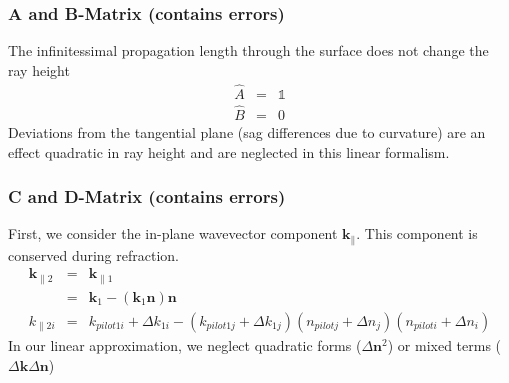 \documentclass[12pt,a4paper,twoside,openright,BCOR10mm,headsepline,titlepage,abstracton,chapterprefix,final]{scrreprt}
\newcommand\Vector[1]{{\mathbf{#1}}}
\newcommand\wavenumber{k}
\newcommand\Wavevector{\Vector{\wavenumber}}
\newcommand\unittensor{\mathds{1}}
\begin{document}
\subsubsection{A and B-Matrix (contains errors)}
The infinitessimal propagation length through the surface does not change the ray height
\begin{eqnarray}
 \hat{A} &=& \unittensor \\
 \hat{B} &=& 0
\end{eqnarray}
Deviations from the tangential plane (sag differences due to curvature) 
are an effect quadratic in ray height and are neglected in this linear formalism.

\subsubsection{C and D-Matrix (contains errors)}
First, we consider the in-plane wavevector component $\Wavevector_\parallel$.
This component is conserved during refraction.
\begin{eqnarray}
 \Wavevector_{\parallel2} 
 &=& \Wavevector_{\parallel1} \\
 &=& \Wavevector_1 - (\Wavevector_1 \Vector{n}) \Vector{n} \\
 \wavenumber_{\parallel2i}
 &=& \wavenumber_{pilot1i} + \Delta \wavenumber_{1i} - ( \wavenumber_{pilot1j} + \Delta \wavenumber_{1j} )( n_{pilotj} + \Delta n_j )( n_{piloti} + \Delta n_i )
\end{eqnarray}
In our linear approximation, we neglect quadratic forms ($\Delta \Vector{n}^2$) or mixed terms ($\Delta \Wavevector \Delta \Vector{n}$)
\end{document}
